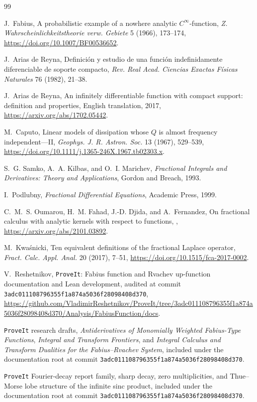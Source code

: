 \documentclass[11pt,oneside]{article}
\numberwithin{equation}{section}
\theoremstyle{plain}
\theoremstyle{definition}
\theoremstyle{remark}
\newcommand{\RepoCommit}{\nolinkurl{3adc011108796355f1a874a5036f28098408d370}}
\newcommand{\RepoRoot}{\url{https://github.com/VladimirReshetnikov/ProveIt/tree/3adc011108796355f1a874a5036f28098408d370/Analysis/FabiusFunction/docs}}
\begin{document}
\begin{thebibliography}{99}

J.~Fabius,
\newblock A probabilistic example of a nowhere analytic $C^\infty$-function,
\newblock \emph{Z. Wahrscheinlichkeitstheorie verw. Gebiete} 5 (1966),
173--174,
\newblock \url{https://doi.org/10.1007/BF00536652}.

J.~Arias de Reyna,
\newblock Definici\'on y estudio de una funci\'on indefinidamente diferenciable
de soporte compacto,
\newblock \emph{Rev. Real Acad. Ciencias Exactas F\'isicas Naturales} 76 (1982),
21--38.

J.~Arias de Reyna,
\newblock An infinitely differentiable function with compact support:
definition and properties,
\newblock English translation, 2017,
\newblock \url{https://arxiv.org/abs/1702.05442}.

M.~Caputo,
\newblock Linear models of dissipation whose $Q$ is almost frequency
independent---II,
\newblock \emph{Geophys. J. R. Astron. Soc.} 13 (1967), 529--539,
\newblock \url{https://doi.org/10.1111/j.1365-246X.1967.tb02303.x}.

S.~G. Samko, A.~A. Kilbas, and O.~I. Marichev,
\newblock \emph{Fractional Integrals and Derivatives: Theory and Applications},
\newblock Gordon and Breach, 1993.

I.~Podlubny,
\newblock \emph{Fractional Differential Equations},
\newblock Academic Press, 1999.

C.~M.~S. Oumarou, H.~M. Fahad, J.-D. Djida, and A.~Fernandez,
\newblock On fractional calculus with analytic kernels with respect to functions,
,
\newblock \url{https://arxiv.org/abs/2101.03892}.

M.~Kwa\'snicki,
\newblock Ten equivalent definitions of the fractional Laplace operator,
\newblock \emph{Fract. Calc. Appl. Anal.} 20 (2017), 7--51,
\newblock \url{https://doi.org/10.1515/fca-2017-0002}.

V.~Reshetnikov,
\newblock \texttt{ProveIt}: Fabius function and Rvachev up-function
documentation and Lean development,
\newblock audited at commit \RepoCommit,
\newblock \RepoRoot.

\texttt{ProveIt} research drafts,
\newblock \emph{Antiderivatives of Monomially Weighted Fabius-Type Functions},
\emph{Integral and Transform Frontiers}, and
\emph{Integral Calculus and Transform Dualities for the Fabius--Rvachev System},
\newblock included under the documentation root at commit \RepoCommit.

\texttt{ProveIt} Fourier-decay report family,
\newblock sharp decay, zero multiplicities, and Thue--Morse lobe structure of
the infinite sinc product,
\newblock included under the documentation root at commit \RepoCommit.

\end{thebibliography}
\end{document}
